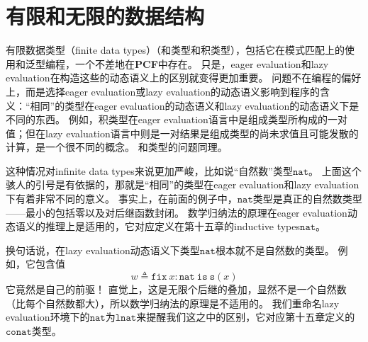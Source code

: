 \section{有限和无限的数据结构}

有限数据类型（finite data types）（和类型和积类型），包括它在模式匹配上的使用和泛型编程，一个不差地在\textbf{PCF}中存在。
只是，\gls{eager evaluation}和\gls{lazy evaluation}在构造这些的动态语义上的区别就变得更加重要。
问题不在编程的偏好上，而是选择\gls{eager evaluation}或\gls{lazy evaluation}的动态语义影响到程序的含义：“相同”的类型在\gls{eager evaluation}的动态语义和\gls{lazy evaluation}的动态语义下是不同的东西。
例如，积类型在\gls{eager evaluation}语言中是组成类型所构成的一对值；但在\gls{lazy evaluation}语言中则是一对结果是组成类型的尚未求值且可能发散的计算，是一个很不同的概念。
和类型的问题同理。

这种情况对\gls{infinite data types}来说更加严峻，比如说“自然数”类型\(\mathtt{nat}\)。
上面这个骇人的引号是有依据的，那就是“相同”的类型在\gls{eager evaluation}和\gls{lazy evaluation}下有着非常不同的意义。
事实上，在前面的例子中，\(\mathtt{nat}\)类型是真正的自然数类型——最小的包括零以及对后继函数封闭。
数学归纳法的原理在\gls{eager evaluation}动态语义的推理上是适用的，它对应定义在第十五章的\gls{inductive types}\(\mathtt{nat}\)。

换句话说，在\gls{lazy evaluation}动态语义下类型\(\mathtt{nat}\)根本就不是自然数的类型。
例如，它包含值
\[
	w \triangleq \mathtt{fix}\ x: \mathtt{nat}\ \mathtt{is}\ \mathtt{s}(x)
\]
它竟然是自己的前驱！
直觉上，这是无限个后继的叠加，显然不是一个自然数（比每个自然数都大），所以数学归纳法的原理是不适用的。
我们重命名\gls{lazy evaluation}环境下的\(\mathtt{nat}\)为\(\mathtt{lnat}\)来提醒我们这之中的区别，它对应第十五章定义的\(\mathtt{conat}\)类型。
